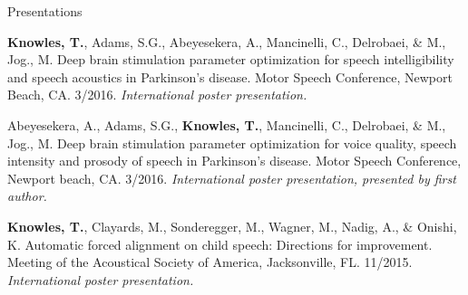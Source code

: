 \documentclass{resume} %
\begin{document}
\begin{rSection}{Presentations}
	
	
	{\bf Knowles, T.}, Adams, S.G., Abeyesekera, A., Mancinelli, C., Delrobaei, \& M., Jog., M. Deep brain stimulation parameter optimization for speech intelligibility and speech acoustics in Parkinson's disease. Motor Speech Conference, Newport Beach, CA. 3/2016. \emph{International poster presentation.}
	
	Abeyesekera, A., Adams, S.G., {\bf Knowles, T.}, Mancinelli, C., Delrobaei, \& M., Jog., M. Deep brain stimulation parameter optimization for voice quality, speech intensity and prosody of speech in Parkinson's disease. Motor Speech Conference, Newport beach, CA. 3/2016. \emph{International poster presentation, presented by first author.}
	
	
	{\bf Knowles, T.}, Clayards, M., Sonderegger, M., Wagner, M., Nadig, A., \& Onishi, K. Automatic forced alignment on child speech: Directions for improvement. Meeting of the Acoustical Society of America, Jacksonville, FL. 11/2015. \emph{International poster presentation.}
	

\end{rSection}
\end{document}

